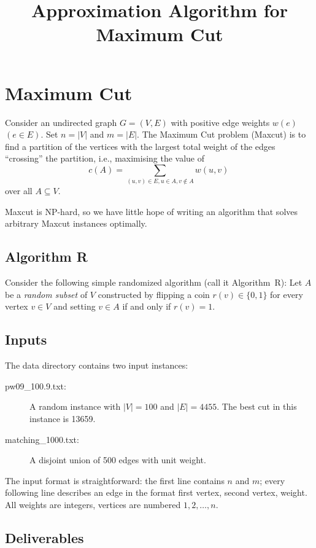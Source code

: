 \documentclass{tufte-handout}
\title{\sf Approximation Algorithm for Maximum Cut}
\begin{document}
\maketitle
{}

\section{Maximum Cut}
Consider an undirected graph $G=(V,E)$ with positive edge weights
$w(e)$ $(e\in E)$.
Set $n=|V|$ and $m=|E|$.
The Maximum Cut problem (Maxcut) is to find a partition of the
vertices with the largest total weight of the edges ``crossing'' the
partition, i.e., maximising the value of \[c(A)= \sum_{(u,v)\in E,
  u\in A, v\notin A} w(u,v)\,\] over all $A\subseteq V$.

Maxcut is NP-hard, so we have little hope of writing an algorithm that
solves arbitrary Maxcut instances optimally.

\subsection{Algorithm R}

Consider the following simple randomized algorithm (call it
Algorithm~R): Let $A$ be a \emph{random subset} of $V$ constructed by
flipping a coin $r(v)\in\{0,1\}$ for every vertex $v\in V$ and setting
$v\in A$ if and only if $r(v)=1$.

\subsection{Inputs}

The  data directory contains two input instances:
\begin{description}
\item[ pw09\_100.9.txt:] A random instance with $|V|=100$ and
  $|E|=4455$. The best cut in this instance is
  13659.
\item[ matching\_1000.txt:] A disjoint union of 500 edges with unit weight.
\end{description}

The input format is straightforward: the first line contains $n$ and
$m$; every following line describes an edge in the format first
vertex, second vertex, weight.
All weights are integers, vertices are numbered $1,2,\ldots, n$.

\subsection{Deliverables}
\end{document}

